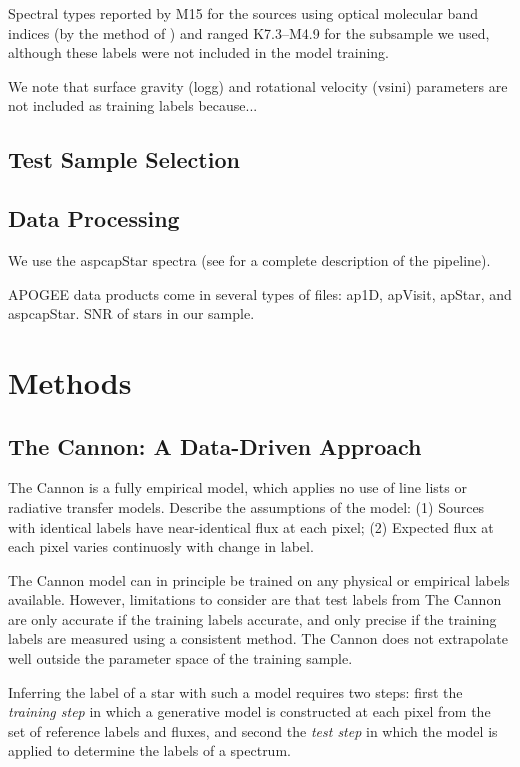 \documentclass[modern]{aastex62}
\begin{document}
Spectral types reported by M15 for the sources using optical molecular band indices (by the method of \citealt{Lepine:2013}) and ranged K7.3--M4.9 for the subsample we used, although these labels were not included in the model training.

We note that surface gravity (logg) and rotational velocity (vsini) parameters are not included as training labels because...

\subsection{Test Sample Selection}

\subsection{Data Processing}

We use the aspcapStar spectra (see \citealt{Perez:2016} for a complete description of the pipeline).

APOGEE data products come in several types of files: ap1D, apVisit, apStar, and aspcapStar. SNR of stars in our sample.


\section{Methods} \label{sec:cannon}

\subsection{The Cannon: A Data-Driven Approach}

The Cannon is a fully empirical model, which applies no use of line lists or radiative transfer models. Describe the assumptions of the model: (1) Sources with identical labels have near-identical flux at each pixel; (2) Expected flux at each pixel varies continuosly with change in label. 

The Cannon model can in principle be trained on any physical or empirical labels available. However, limitations to consider are that test labels from The Cannon are only accurate if the training labels accurate, and only precise if the training labels are measured using a consistent method. The Cannon does not extrapolate well outside the parameter space of the training sample.

Inferring the label of a star with such a model requires two steps: first the \emph{training step} in which a generative model is constructed at each pixel from the set of reference labels and fluxes, and second the \emph{test step} in which the model is applied to determine the labels of a spectrum.
\end{document}
